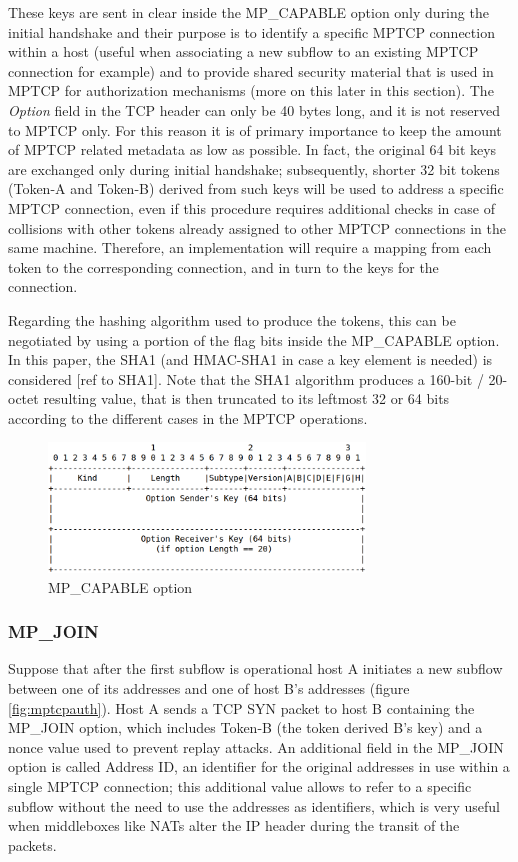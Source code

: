 These keys are sent in clear inside the MP\_CAPABLE option only during the initial handshake and their purpose is to identify a specific MPTCP connection within a host (useful when associating a new subflow to an existing MPTCP connection for example) and to provide shared security material that is used in MPTCP for authorization mechanisms (more on this later in this section). The \textit{Option} field in the TCP header can only be 40 bytes long, and it is not reserved to MPTCP only. For this reason it is of primary importance to keep the amount of MPTCP related metadata as low as possible. In fact, the original 64 bit keys are exchanged only during initial handshake; subsequently, shorter 32 bit tokens (Token-A and Token-B) derived from such keys will be used to address a specific MPTCP connection, even if this procedure requires additional checks in case of collisions with other tokens already assigned to other MPTCP connections in the same machine. Therefore, an implementation will require a mapping from each token to the corresponding connection, and in turn to the keys for the connection.


Regarding the hashing algorithm used to produce the tokens, this can be negotiated by using a portion of the flag bits inside the MP\_CAPABLE option. In this paper, the SHA1 (and HMAC-SHA1 in case a key element is needed) is considered [ref to SHA1]. Note that the SHA1 algorithm produces a 160-bit / 20-octet resulting value, that is then truncated to its leftmost 32 or 64 bits according to the different cases in the MPTCP operations.

\begin{figure}[!htb]
\centering
\includegraphics[width=0.75\textwidth]{images/opt_capable}
\caption{MP\_CAPABLE option}
\label{fig:opt_capable}
\end{figure}

\subsubsection{MP\_JOIN}
Suppose that after the first subflow is operational host A initiates a new subflow between one of its addresses and one of host B's addresses (figure \ref{fig:mptcpauth}). Host A sends a TCP SYN packet to host B containing the MP\_JOIN option, which includes Token-B (the token derived B's key) and a nonce value used to prevent replay attacks. An additional field in the MP\_JOIN option is called Address ID, an identifier for the original addresses in use within a single MPTCP connection; this additional value allows to refer to a specific subflow without the need to use the addresses as identifiers, which is very useful when middleboxes like NATs alter the IP header during the transit of the packets.

